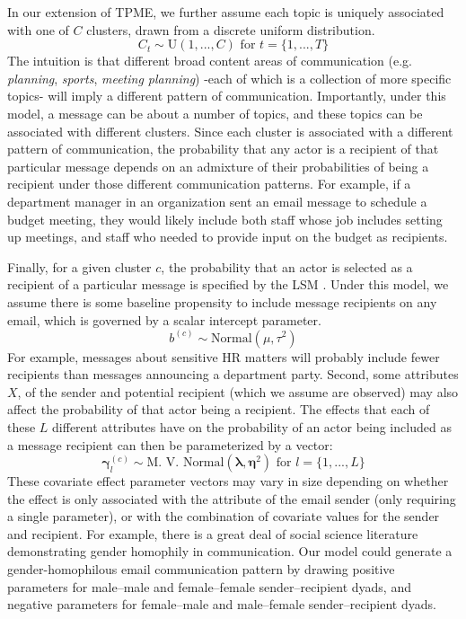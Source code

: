 \documentclass{pnastwo}
\begin{document}
\begin{article}
In our extension of TPME, we further assume each topic is uniquely associated with one of $C$ clusters, drawn from a discrete uniform distribution.
\begin{equation}
	C_t \sim \text{U}(1,...,C) \text{ for } t = \{1, ..., T\}
\end{equation}
The intuition is that different broad content areas of communication (e.g. \emph{planning}, \emph{sports}, \emph{meeting planning}) -each of which is a collection of more specific topics- will imply a different pattern of communication. Importantly, under this model, a message can be about a number of topics, and these topics can be associated with different clusters. Since each cluster is associated with a different pattern of communication, the probability that any actor is a recipient of that particular message depends on an admixture of their probabilities of being a recipient under those different communication patterns. For example, if a department manager in an organization sent an email message to schedule a budget meeting, they would likely include both staff whose job includes setting up meetings, and staff who needed to provide input on the budget as recipients. 

Finally, for a given cluster $c$, the probability that an actor is selected as a recipient of a particular message is specified by the LSM \citep{Hoff2002a}. Under this model, we assume there is some baseline propensity to include message recipients on any email, which is governed by a scalar intercept parameter.
\begin{equation}
	b^{(c)} \sim \text{Normal}(\mu, \tau^2)
\end{equation} 
For example, messages about sensitive HR matters will probably include fewer recipients than messages announcing a department party. Second, some attributes $X$, of the sender and potential recipient (which we assume are observed) may also affect the probability of that actor being a recipient. The effects that each of these $L$ different attributes have on the probability of an actor being included as a message recipient can then be parameterized by a vector: 
\begin{equation}
	\mathbf{\gamma}_l^{(c)} \sim \text{M. V. Normal}(\mathbf{\lambda}, \mathbf{\eta}^2) \text{ for } l = \{1, ..., L\}
\end{equation}
These covariate effect parameter vectors may vary in size depending on whether the effect is only associated with the attribute of the email sender (only requiring a single parameter), or with the combination of covariate values for the sender and recipient. For example, there is a great deal of social science literature demonstrating gender homophily in communication. Our model could generate a gender-homophilous email communication pattern by drawing positive parameters for male--male and female--female sender--recipient dyads, and negative parameters for female--male and male--female sender--recipient dyads. 


\end{article}
\end{document}
